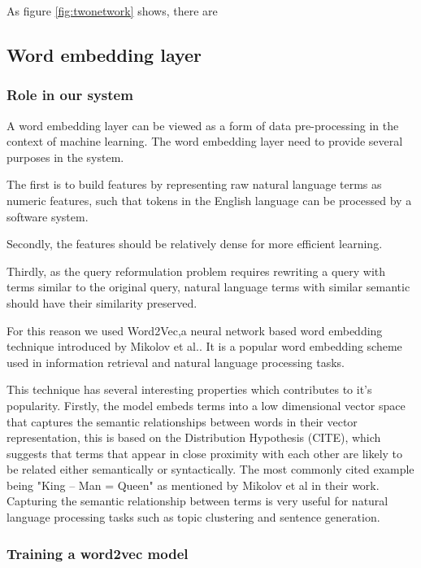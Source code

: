 As figure \ref{fig:twonetwork} shows, there are 



\subsection{Word embedding layer}

\subsubsection{Role in our system}


A word embedding layer can be viewed as a form of data pre-processing in the context of machine learning. The word embedding layer need to provide several purposes in the system. 

The first is to build features by representing raw natural language terms as numeric features, such that tokens in the English language can be processed by a software system. 

Secondly, the features should be relatively dense for more efficient learning.  

Thirdly, as the query reformulation problem requires rewriting a query with terms similar to the original query, natural language terms with similar semantic should have their similarity preserved. 

For this reason we used Word2Vec,a neural network based word embedding technique introduced by Mikolov et al.\cite{mikolov2013distributed}. It is a popular word embedding scheme used in information retrieval and natural language processing tasks. 

This technique has several interesting properties which contributes to it's popularity.  Firstly, the model embeds terms into a low dimensional vector space that captures the semantic relationships between words in their vector representation, this is based on the Distribution Hypothesis (CITE), which suggests that terms that appear in close proximity with each other are likely to be related either semantically or syntactically. The most commonly cited example being "King – Man = Queen" as mentioned by Mikolov et al in their work. Capturing the semantic relationship between terms is very useful for natural language processing tasks such as topic clustering and sentence generation.  

\subsubsection{Training a word2vec model}

